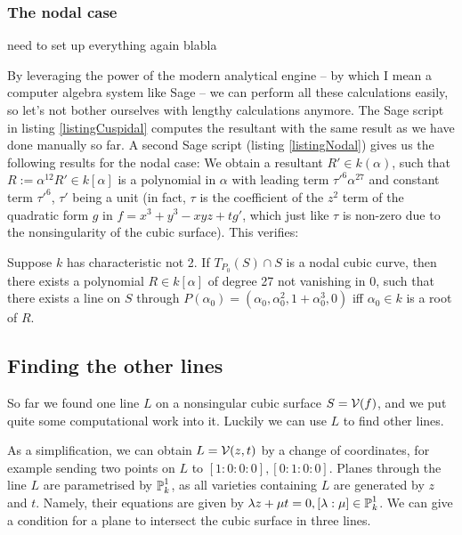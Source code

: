 \subsubsection{The nodal case}
\begin{todo}
\item need to set up everything again blabla
\end{todo}
By leveraging the power of the modern analytical engine -- by which I mean a computer algebra system like Sage \cite{sagemath2014} -- we can perform all these calculations easily, so let's not bother ourselves with lengthy calculations anymore.
The Sage script in listing \ref{listingCuspidal} computes the resultant with the same result as we have done manually so far.
A second Sage script (listing \ref{listingNodal}) gives us the following results for the nodal case:
We obtain a resultant $R' \in k(\alpha)$, such that $R := \alpha^{12}R' \in k[\alpha]$ is a polynomial in $\alpha$ with leading term $\tau'^6\alpha^{27}$ and constant term $\tau'^6$, $\tau'$ being a unit (in fact, $\tau$ is the coefficient of the $z^2$ term of the quadratic form $g$ in $f = x^3 + y^3 - xyz + tg'$, which just like $\tau$ is non-zero due to the nonsingularity of the cubic surface).
This verifies:
\begin{proposition}
Suppose $k$ has characteristic not 2.
If $T_{P_0}(S) \cap S$ is a nodal cubic curve, then there exists a polynomial $R \in k[\alpha]$ of degree 27 not vanishing in 0, such that there exists a line on $S$ through $P(\alpha_0) = (\alpha_0,\alpha_0^2,1+\alpha_0^3,0)$ iff $\alpha_0 \in k$ is a root of $R$.
\end{proposition}

\subsection{Finding the other lines}

So far we found one line $L$ on a nonsingular cubic surface $S = \operatorname{\mathcal V}(f)$, and we put quite some computational work into it.
Luckily we can use $L$ to find other lines.

As a simplification, we can obtain $L=\operatorname{\mathcal V}(z,t)$ by a change of coordinates, for example sending two points on $L$ to $[1:0:0:0],[0:1:0:0]$.
Planes through the line $L$ are parametrised by $\operatorname{\mathbb P}^1_k$, as all varieties containing $L$ are generated by $z$ and $t$.
Namely, their equations are given by $\lambda z + \mu t = 0, [\lambda:\mu] \in \operatorname{\mathbb P}^1_k$.
We can give a condition for a plane to intersect the cubic surface in three lines.

